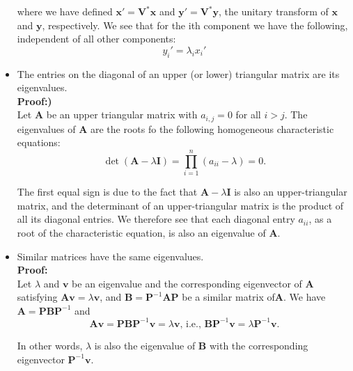 \documentclass[10pt,b5paper,titlepage]{book}
\begin{document}
\begin{itemize}
where we have defined $\mathbf{x}' = \mathbf{V}^{*} \mathbf{x}$ and $\mathbf{y}' = \mathbf{V}^{*} \mathbf{y}$, the unitary transform of $\mathbf{x}$ and $\mathbf{y}$, respectively. We see that for the ith component we have the following, independent of all other components:
\begin{equation}
y_{i}' = \lambda_{i} x_{i}'
\end{equation}

\item The entries on the diagonal of an upper (or lower) triangular matrix are its eigenvalues.\\

\textbf{Proof:)}\\

Let $\mathbf{A}$ be an upper triangular matrix with $a_{i,j} = 0$ for all $i > j$. The eigenvalues of $\mathbf{A}$ are the roots fo the following homogeneous characteristic equations:
\begin{equation}
\det{(\mathbf{A} - \lambda \mathbf{I})} = \prod_{i=1}^{n}{(a_{ii} - \lambda)} = 0
.\end{equation}

The first equal sign is due to the fact that $\mathbf{A} - \lambda \mathbf{I}$ is also an upper-triangular matrix, and the determinant of an upper-triangular matrix is the product of all its diagonal entries. We therefore see that each diagonal entry $a_{ii}$, as a root of the characteristic equation, is also an eigenvalue of $\mathbf{A}$.

\item Similar matrices have the same eigenvalues.\\

\textbf{Proof:}\\

Let $\lambda$ and $\mathbf{v}$ be an eigenvalue and the corresponding eigenvector of $\mathbf{A}$ satisfying $\mathbf{A} \mathbf{v} = \lambda \mathbf{v}$, and $\mathbf{B} = \mathbf{P}^{-1} \mathbf{A} \mathbf{P}$ be a similar matrix of$\mathbf{A}$. We have $\mathbf{A} = \mathbf{P} \mathbf{B} \mathbf{P}^{-1}$ and
\begin{equation}
\mathbf{A} \mathbf{v} = \mathbf{P} \mathbf{B} \mathbf{P}^{-1} \mathbf{v} = \lambda \mathbf{v}
\text{, i.e., }
\mathbf{B} \mathbf{P}^{-1} \mathbf{v} = \lambda \mathbf{P}^{-1} \mathbf{v}
.\end{equation}

In other words, $\lambda$ is also the eigenvalue of $\mathbf{B}$ with the corresponding eigenvector $\mathbf{P}^{-1} \mathbf{v}$.


\end{itemize}
\end{document}
